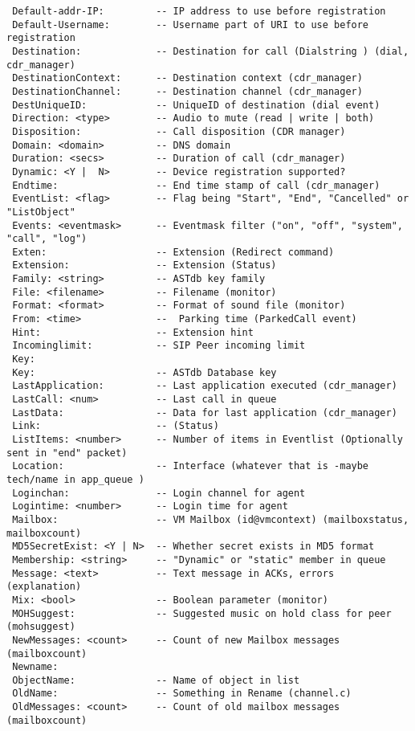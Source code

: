 \begin{verbatim}
 Default-addr-IP:         -- IP address to use before registration
 Default-Username:        -- Username part of URI to use before registration
 Destination:             -- Destination for call (Dialstring ) (dial, cdr_manager)
 DestinationContext:      -- Destination context (cdr_manager)
 DestinationChannel:      -- Destination channel (cdr_manager)
 DestUniqueID:            -- UniqueID of destination (dial event)
 Direction: <type>        -- Audio to mute (read | write | both) 
 Disposition:             -- Call disposition (CDR manager)
 Domain: <domain>         -- DNS domain
 Duration: <secs>         -- Duration of call (cdr_manager)
 Dynamic: <Y |  N>        -- Device registration supported?
 Endtime:                 -- End time stamp of call (cdr_manager)
 EventList: <flag>        -- Flag being "Start", "End", "Cancelled" or "ListObject"
 Events: <eventmask>      -- Eventmask filter ("on", "off", "system", "call", "log")
 Exten:                   -- Extension (Redirect command)
 Extension:               -- Extension (Status)
 Family: <string>         -- ASTdb key family
 File: <filename>         -- Filename (monitor)
 Format: <format>         -- Format of sound file (monitor)
 From: <time>             --  Parking time (ParkedCall event)
 Hint:                    -- Extension hint
 Incominglimit:           -- SIP Peer incoming limit
 Key:
 Key:                     -- ASTdb Database key
 LastApplication:         -- Last application executed (cdr_manager)
 LastCall: <num>          -- Last call in queue
 LastData:                -- Data for last application (cdr_manager)
 Link:                    -- (Status)
 ListItems: <number>      -- Number of items in Eventlist (Optionally sent in "end" packet)
 Location:                -- Interface (whatever that is -maybe tech/name in app_queue )
 Loginchan:               -- Login channel for agent
 Logintime: <number>      -- Login time for agent
 Mailbox:                 -- VM Mailbox (id@vmcontext) (mailboxstatus, mailboxcount)
 MD5SecretExist: <Y | N>  -- Whether secret exists in MD5 format
 Membership: <string>     -- "Dynamic" or "static" member in queue
 Message: <text>          -- Text message in ACKs, errors (explanation)
 Mix: <bool>              -- Boolean parameter (monitor)
 MOHSuggest:              -- Suggested music on hold class for peer (mohsuggest)
 NewMessages: <count>     -- Count of new Mailbox messages (mailboxcount)
 Newname:
 ObjectName:              -- Name of object in list
 OldName:                 -- Something in Rename (channel.c)
 OldMessages: <count>     -- Count of old mailbox messages (mailboxcount)

\end{verbatim}
